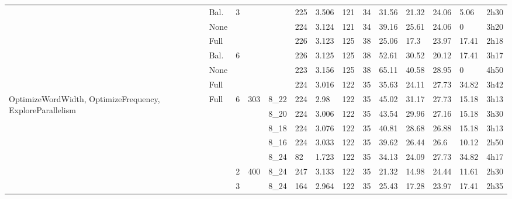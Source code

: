 \begin{sidewaystable}
\begin{tabularx}{\textheight}{p{3.5cm}|X|X|X|X|X|X|X|X|X|X|X|X|p{1cm}|}
      \hline
      & Bal.    & 3   &          &       & 225             & 3.506          & 121                & 34                & 31.56    & 21.32  & 24.06     & 5.06     & 2h30       \\
      & None        &     &          &       & 224             & 3.124          & 121                & 34                & 39.16    & 25.61  & 24.06     & 0        & 3h20       \\
      & Full        &     &          &       & 226             & 3.123          & 125                & 38                & 25.06    & 17.3   & 23.97     & 17.41    & 2h18       \\
      \hline
      & Bal.    & 6   &          &       & 226             & 3.125          & 125                & 38                & 52.61    & 30.52  & 20.12     & 17.41    & 3h17       \\
      & None        &     &          &       & 223             & 3.156          & 125                & 38                & 65.11    & 40.58  & 28.95     & 0        & 4h50       \\
      & Full        &     &          &       & 224             & 3.016          &       122                & 35                & 35.63    & 24.11  & 27.73     & 34.82    & 3h42       \\
      \hline
      \multirow{5}{2cm}{OptimizeWordWidth, OptimizeFrequency, ExploreParallelism}        & Full        & 6   & 303      & 8\_22 & 224             & 2.98           & 122                & 35                & 45.02    & 31.17  & 27.73     & 15.18    & 3h13       \\
      &             &     &          & 8\_20 & 224             & 3.006          &       122                & 35                & 43.54    & 29.96  & 27.16     & 15.18    & 3h30       \\
      &             &     &          & 8\_18 & 224             & 3.076          & 122                & 35                & 40.81    & 28.68  & 26.88     & 15.18    & 3h13       \\
      &             &     &          & 8\_16 & 224             & 3.033          & 122                & 35                & 39.62    & 26.44  & 26.6      & 10.12    & 2h50       \\
      &             &     &          & 8\_24 & 82              & 1.723          & 122                & 35                & 34.13    & 24.09  & 27.73     & 34.82    & 4h17       \\
      \hline
      &             & 2   & 400      & 8\_24 & 247             & 3.133          &       122                & 35                & 21.32    & 14.98  & 24.44     & 11.61    & 2h30       \\
      &             & 3   &          & 8\_24 & 164             & 2.964          & 122                & 35                & 25.43    & 17.28  & 23.97     & 17.41    & 2h35       \\


\end{tabularx}
\end{sidewaystable}
